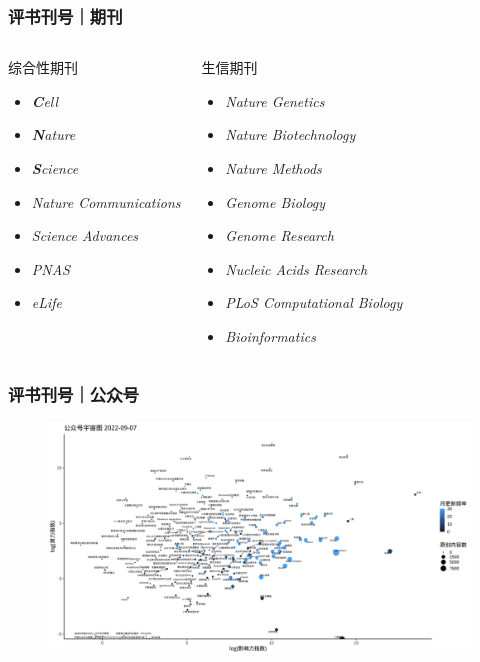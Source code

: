 \documentclass[11pt]{ctexbeamer}
\begin{document}
\begin{frame}
\frametitle{评书刊号｜期刊}
\begin{columns}
  \begin{block}{综合性期刊}
    \begin{itemize}
      \item \textit{\textbf{C}ell}
      \item \textit{\textbf{N}ature}
      \item \textit{\textbf{S}cience}
      \item \textit{Nature Communications}
      \item \textit{Science Advances}
      \item \textit{PNAS}
      \item \textit{eLife}
    \end{itemize}
  \end{block}
  \begin{block}{生信期刊}
    \begin{itemize}
      \item \textit{Nature Genetics}
      \item \textit{Nature Biotechnology}
      \item \textit{Nature Methods}
      \item \textit{Genome Biology}
      \item \textit{Genome Research}
      \item \textit{Nucleic Acids Research}
      \item \textit{PLoS Computational Biology}
      \item \textit{Bioinformatics}
    \end{itemize}
  \end{block}
\end{columns}
\end{frame}
\begin{frame}
\frametitle{评书刊号｜公众号}
  \begin{figure}
    \centering
    \includegraphics[width=1.05\textwidth]{wechat_02.png}
  \end{figure}
\end{frame}
\end{document}

